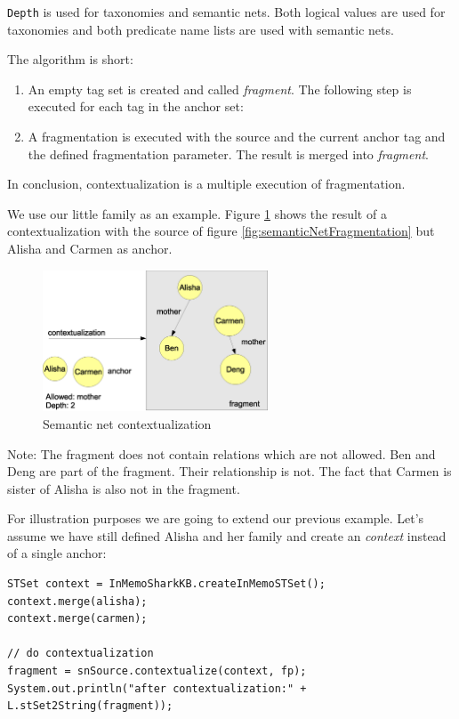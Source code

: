 {\tt Depth} is used for taxonomies and semantic nets. Both logical values are used for taxonomies and both predicate name lists are used with semantic nets.

The algorithm is short:

\begin{enumerate}

    \item 
An empty tag set is created and called {\it fragment}.
The following step is executed for each tag in the anchor set:

\item
A fragmentation is executed with the source and the current anchor tag and the defined fragmentation parameter. The result is merged into {\it fragment}.

\end{enumerate}
In conclusion, contextualization is a multiple execution of fragmentation.

We use our little family as an example. Figure \ref{fig:semanticnetContextualization} shows the result of a contextualization with the source of figure \ref{fig:semanticNetFragmentation} but Alisha and Carmen as anchor. 

\begin{figure}[t]
\centering
\includegraphics[width=0.60\textwidth]{semanticnetContextualization.eps}
\caption{Semantic net contextualization}
\label{fig:semanticnetContextualization}
\end{figure}

Note: The fragment does not contain relations which are not allowed.
Ben and Deng are part of the fragment. Their relationship is not.
The fact that Carmen is sister of Alisha is also not in the fragment.

For illustration purposes we are going to extend our previous example. 
Let's assume we have still defined Alisha and her family and create an
{\it context} instead of a single anchor:

\begin{verbatim}
STSet context = InMemoSharkKB.createInMemoSTSet();
context.merge(alisha);
context.merge(carmen);

// do contextualization
fragment = snSource.contextualize(context, fp);
System.out.println("after contextualization:" + L.stSet2String(fragment));
\end{verbatim}

